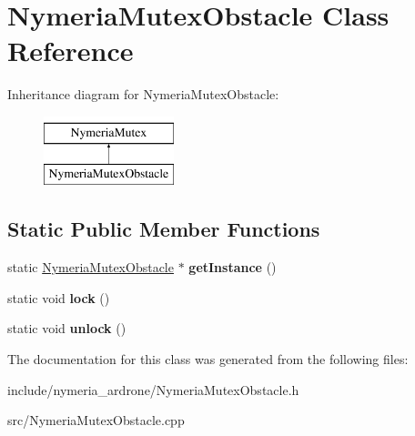 \hypertarget{classNymeriaMutexObstacle}{\section{\-Nymeria\-Mutex\-Obstacle \-Class \-Reference}
\label{classNymeriaMutexObstacle}
}
\-Inheritance diagram for \-Nymeria\-Mutex\-Obstacle\-:\begin{figure}[H]
\begin{center}
\leavevmode
\includegraphics[height=2.000000cm]{classNymeriaMutexObstacle}
\end{center}
\end{figure}
\subsection*{\-Static \-Public \-Member \-Functions}
\begin{DoxyCompactItemize}
\item 
\hypertarget{classNymeriaMutexObstacle_a781305cfbe891eaf547c9d023b42d272}{static \hyperlink{classNymeriaMutexObstacle}{\-Nymeria\-Mutex\-Obstacle} $\ast$ {\bfseries get\-Instance} ()}\label{classNymeriaMutexObstacle_a781305cfbe891eaf547c9d023b42d272}

\item 
\hypertarget{classNymeriaMutexObstacle_ac9c77e3c39a6037aaf356d9d82460a40}{static void {\bfseries lock} ()}\label{classNymeriaMutexObstacle_ac9c77e3c39a6037aaf356d9d82460a40}

\item 
\hypertarget{classNymeriaMutexObstacle_ae10b2974844ac973a692be10eeaddf79}{static void {\bfseries unlock} ()}\label{classNymeriaMutexObstacle_ae10b2974844ac973a692be10eeaddf79}

\end{DoxyCompactItemize}


\-The documentation for this class was generated from the following files\-:\begin{DoxyCompactItemize}
\item 
include/nymeria\-\_\-ardrone/\-Nymeria\-Mutex\-Obstacle.\-h\item 
src/\-Nymeria\-Mutex\-Obstacle.\-cpp\end{DoxyCompactItemize}
